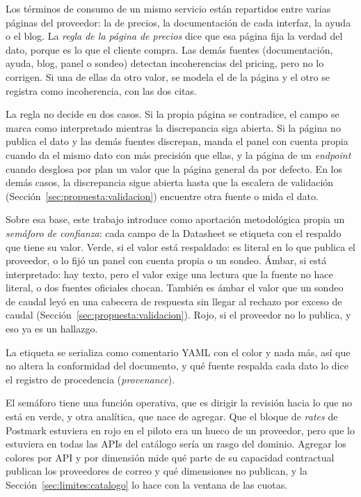 Los términos de consumo de un mismo servicio están repartidos entre varias páginas del proveedor: la de precios, la documentación de cada interfaz, la ayuda o el blog.
La \textit{regla de la página de precios} dice que esa página fija la verdad del dato, porque es lo que el cliente compra.
Las demás fuentes (documentación, ayuda, blog, panel o sondeo) detectan incoherencias del pricing, pero no lo corrigen.
Si una de ellas da otro valor, se modela el de la página y el otro se registra como incoherencia, con las dos citas.

La regla no decide en dos casos.
Si la propia página se contradice, el campo se marca como interpretado mientras la discrepancia siga abierta.
Si la página no publica el dato y las demás fuentes discrepan, manda el panel con cuenta propia cuando da el mismo dato con más precisión que ellas, y la página de un \textit{endpoint} cuando desglosa por plan un valor que la página general da por defecto. En los demás casos, la discrepancia sigue abierta hasta que la escalera de validación (Sección~\ref{sec:propuesta:validacion}) encuentre otra fuente o mida el dato.

Sobre esa base, este trabajo introduce como aportación metodológica propia un \textit{semáforo de confianza}: cada campo de la Datasheet se etiqueta con el respaldo que tiene su valor.
Verde, si el valor está respaldado: es literal en lo que publica el proveedor, o lo fijó un panel con cuenta propia o un sondeo.
Ámbar, si está interpretado: hay texto, pero el valor exige una lectura que la fuente no hace literal, o dos fuentes oficiales chocan.
También es ámbar el valor que un sondeo de caudal leyó en una cabecera de respuesta sin llegar al rechazo por exceso de caudal (Sección~\ref{sec:propuesta:validacion}).
Rojo, si el proveedor no lo publica, y eso ya es un hallazgo.

La etiqueta se serializa como comentario YAML con el color y nada más, así que no altera la conformidad del documento, y qué fuente respalda cada dato lo dice el registro de procedencia (\textit{provenance}).

El semáforo tiene una función operativa, que es dirigir la revisión hacia lo que no está en verde, y otra analítica, que nace de agregar.
Que el bloque de \textit{rates} de Postmark estuviera en rojo en el piloto era un hueco de un proveedor, pero que lo estuviera en todas las APIs del catálogo sería un rasgo del dominio.
Agregar los colores por API y por dimensión mide qué parte de su capacidad contractual publican los proveedores de correo y qué dimensiones no publican, y la Sección~\ref{sec:limites:catalogo} lo hace con la ventana de las cuotas.

